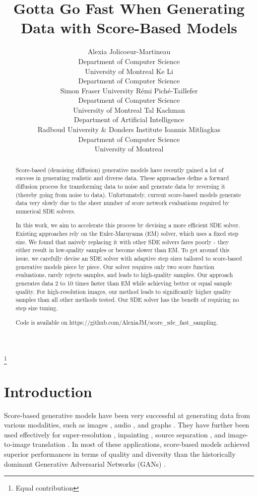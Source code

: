 \documentclass{article}
\title{Gotta Go Fast When Generating Data with Score-Based Models}
\author{
 Alexia Jolicoeur-Martineau\\
 Department of Computer Science\\
 University of Montreal
 \And 
 Ke Li\textsuperscript{} \\
 Department of Computer Science\\
 Simon Fraser University
 \And 
 Rémi Piché-Taillefer\textsuperscript{} \\
 Department of Computer Science\\
 University of Montreal
 \And 
 Tal Kachman\textsuperscript{} \\
 Department of Artificial Intelligence \\
 Radboud University \& Donders Institute
\And
 Ioannis Mitliagkas \\
 Department of Computer Science\\
 University of Montreal
}
\newcommand\blfootnote[1]{\begingroup
  \renewcommand\thefootnote{}\footnote{#1}\addtocounter{footnote}{-1}\endgroup
}
\begin{document}
\blfootnote{ Equal contribution}

\maketitle

\begin{abstract}

   Score-based (denoising diffusion) generative models have recently gained a lot of success in generating realistic and diverse data. These approaches define a forward diffusion process for transforming data to noise and generate data by reversing it (thereby going from noise to data). Unfortunately, current score-based models generate data very slowly due to the sheer number of score network evaluations required by numerical SDE solvers. 
   
   In this work, we aim to accelerate this process by devising a more efficient SDE solver. Existing approaches rely on the Euler-Maruyama (EM) solver, which uses a fixed step size. We found that naively replacing it with other SDE solvers fares poorly - they either result in low-quality samples or become slower than EM. To get around this issue, we carefully devise an SDE solver with adaptive step sizes tailored to score-based generative models piece by piece. Our solver requires only two score function evaluations, rarely rejects samples, and leads to high-quality samples. Our approach generates data 2 to 10 times faster than EM while achieving better or equal sample quality. For high-resolution images, our method leads to significantly higher quality samples than all other methods tested. Our SDE solver has the benefit of requiring no step size tuning.
   
   Code is available on https://github.com/AlexiaJM/score\_sde\_fast\_sampling.
 
\end{abstract}

\section{Introduction}

Score-based generative models \citep{song2019generative, song2020improved, ho2020denoising, jolicoeur2020adversarial, song2020score, hmc2021remipt} have been very successful at generating data from various modalities, such as images \citep{ho2020denoising, song2020score}, audio \citep{chen2020wavegrad,kong2020diffwave, mittal2021symbolic, kameoka2020voicegrad}, and graphs \citep{niu2020permutation}. They have further been used effectively for super-resolution \citep{saharia2021image,kadkhodaie2020solving}, inpainting \citep{kadkhodaie2020solving, song2020improved}, source separation \citep{jayaram2020source}, and image-to-image translation \citep{sasaki2021unit}. In most of these applications, score-based models achieved superior performances in terms of quality and diversity than the historically dominant Generative Adversarial Networks (GANs) \citep{GAN}.
\end{document}
